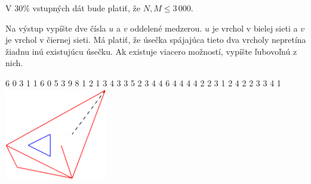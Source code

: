 \bigskip
V $30\%$ vstupných dát bude platiť, že $N,M \leq 3\,000$.


Na výstup vypíšte dve čísla $u$ a $v$ oddelené medzerou. $u$ je vrchol v bielej sieti a $v$ je
vrchol v čiernej sieti. Má platiť, že úsečka spájajúca tieto dva vrcholy nepretína žiadnu inú
existujúcu úsečku. Ak existuje viacero možností, vypíšte ľubovoľnú z nich.


 6
0 3
1 1
6 0
5 3
9 8
1 2
1 3
4 3
3 5
2 3
4 4
6 4
4 4
4 2
2 3
1 2
4 2
2 3
3 4
 1
\sampleCOMMENT
\includegraphics[height=4cm]{img/fig11.pdf}
\sampleEND


